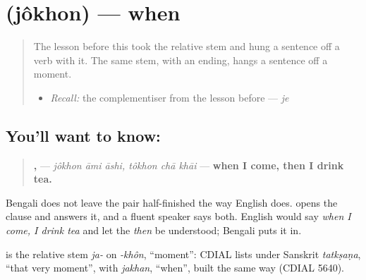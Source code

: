 \section[\texorpdfstring{\bn{যখন} (jôkhon)}{যখন (jôkhon)}]{ (jôkhon) — when}

\label{lesson:BN-C19-jokhon}



\begin{quote}
The lesson before this took the relative stem \textbf{} and hung a sentence off a verb with it. The same stem, with an ending, hangs a sentence off a moment.

\begin{itemize}
\raggedright
  \item \emph{Recall:} the complementiser from the lesson before — \emph{je}
\end{itemize}
\end{quote}

\subsection*{You'll want to know: }
\begin{quote}
\textbf{  ,   } — \emph{jôkhon āmi āshi, tôkhon chā khāi} — \textbf{when I come, then I drink tea.}
\end{quote}

Bengali does not leave the pair half-finished the way English does. \textbf{} opens the clause and \textbf{} answers it, and a fluent speaker says both. English would say \emph{when I come, I drink tea} and let the \emph{then} be understood; Bengali puts it in.

\begin{cousinweb}
\textbf{} is the relative stem \emph{ja-} on \emph{-khôn}, \textquotedblleft{}moment\textquotedblright{}: CDIAL lists \textbf{} under Sanskrit \emph{tatkṣaṇa}, \textquotedblleft{}that very moment\textquotedblright{}, with \emph{jakhan}, \textquotedblleft{}when\textquotedblright{}, built the same way (CDIAL 5640).
\end{cousinweb}


